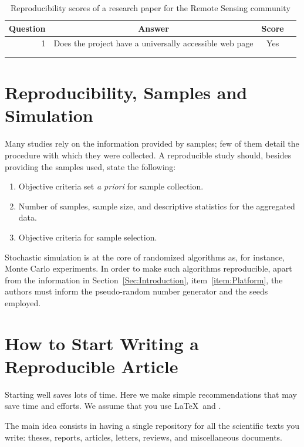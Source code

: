 \documentclass[journal]{IEEEtran}
\begin{document}
	
	\begin{table}[hbt]
		\centering
		\caption{Reproducibility scores of a research paper for the Remote Sensing community}
		\label{tab:my_label}
		\begin{tabular}{rccc}\toprule
			Question    & Answer & Score \\ \midrule
			1           & Does the project have a universally accessible web page & Yes & \\ 
			&  \\
			& \\ \bottomrule
		\end{tabular}
	\end{table}

\section{Reproducibility, Samples and Simulation}

Many studies rely on the information provided by samples;
few of them detail the procedure with which they were collected.
A reproducible study should, besides providing the samples used, state the following:
\begin{enumerate}
	\item Objective criteria set \textit{a priori} for sample collection.
	\item Number of samples, sample size, and descriptive statistics for the aggregated data.
	\item Objective criteria for sample selection.
\end{enumerate}

Stochastic simulation is at the core of randomized algorithms as, for instance, Monte Carlo experiments.
In order to make such algorithms reproducible, apart from the information in Section~\ref{Sec:Introduction}, item~\ref{item:Platform}, the authors must inform the pseudo-random number generator and the seeds employed.

\section{How to Start Writing a Reproducible Article}

Starting well saves lots of time.
Here we make simple recommendations that may save time and efforts.
We assume that you use \LaTeX\ and \BibTeX.

The main idea consists in having a single repository for all the scientific texts you write: 
theses, 
reports, 
articles, 
letters,
reviews,
and miscellaneous documents.
\end{document}
